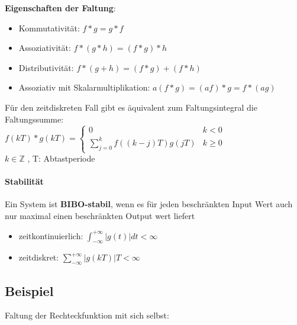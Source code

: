 \documentclass[12pt,a4paper]{article}
\newcommand{\nl}{\\[0.1cm]}
\begin{document}
\textbf{Eigenschaften der Faltung}:
\begin{itemize}
\item Kommutativität: $f \ast g = g \ast f$
\item Assoziativität: $f \ast (g \ast h) = (f \ast g) \ast h$
\item Distributivität: $f \ast (g+h) = (f \ast g) + (f \ast h)$
\item Assoziativ mit Skalarmultiplikation: $a(f\ast g) = (af)\ast g = f \ast (ag)$
\end{itemize}
\flushleft
Für den zeitdiskreten Fall gibt es äquivalent zum Faltungsintegral die Faltungssumme:\nl
$\displaystyle f(kT) \ast g(kT) = \begin{cases} 0 & k<0 \\
\displaystyle \sum_{j=0}^k f((k-j)T)g(jT) & k \geq 0
\end{cases}$\nl
$k \in \mathbb{Z}$ , T: Abtastperiode

\paragraph{Stabilität}
Ein System ist \textbf{BIBO-stabil}, wenn es für jeden beschränkten Input Wert auch nur maximal einen beschränkten 
Output wert liefert\nl
\begin{itemize}
\item zeitkontinuierlich: $\displaystyle \int_{-\infty}^{+\infty} |g(t)|dt < \infty$
\item zeitdiskret: $\displaystyle \sum_{-\infty}^{+\infty} |g(kT)|T < \infty$
\end{itemize}

\subsection{Beispiel}
Faltung der Rechteckfunktion mit sich selbst:\nl
\end{document}
